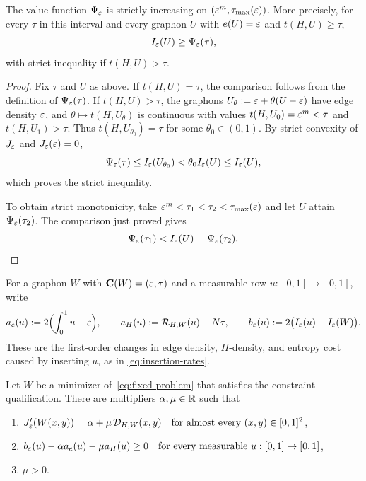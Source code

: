 \begin{lemma}\label{lem:fixed-monotonicity}
The value function $\Psi_\varepsilon$ is strictly increasing on
$(\varepsilon^m,\tau_{\max}(\varepsilon))$.
More precisely, for every $\tau$ in this interval and every graphon $U$
with $e(U)=\varepsilon$ and $t(H,U)\ge\tau$,
\[
  I_\varepsilon(U)\ge\Psi_\varepsilon(\tau),
\]
with strict inequality if $t(H,U)>\tau$.
\end{lemma}

\begin{proof}
Fix $\tau$ and $U$ as above. If $t(H,U)=\tau$, the comparison follows
from the definition of $\Psi_\varepsilon(\tau)$.
If $t(H,U)>\tau$, the graphons $U_\theta:=\varepsilon+\theta(U-\varepsilon)$ have edge
density $\varepsilon$, and $\theta\mapsto t(H,U_\theta)$ is continuous with values
$t(H,U_0)=\varepsilon^m<\tau$ and $t(H,U_1)>\tau$.
Thus $t(H,U_{\theta_0})=\tau$ for some $\theta_0\in(0,1)$.
By strict convexity of $J_\varepsilon$ and $J_\varepsilon(\varepsilon)=0$,
\[
  \Psi_\varepsilon(\tau)\le I_\varepsilon(U_{\theta_0})
  <\theta_0I_\varepsilon(U)\le I_\varepsilon(U),
\]
which proves the strict inequality.

To obtain strict monotonicity, take
$\varepsilon^m<\tau_1<\tau_2<\tau_{\max}(\varepsilon)$ and let $U$ attain
$\Psi_\varepsilon(\tau_2)$. The comparison just proved gives
\[
  \Psi_\varepsilon(\tau_1)<I_\varepsilon(U)=\Psi_\varepsilon(\tau_2).
\]
\end{proof}

For a graphon $W$ with $\mathbf C(W)=(\varepsilon,\tau)$ and a measurable
row $u:[0,1]\to[0,1]$, write
\[
  a_e(u):=2\Bigl(\int_0^1u-\varepsilon\Bigr), \qquad
  a_H(u):=\mathcal R_{H,W}(u)-N\tau, \qquad
  b_\varepsilon(u):=2\bigl(I_\varepsilon(u)-I_\varepsilon(W)\bigr).
\]
These are the first-order changes in edge density, $H$-density, and
entropy cost caused by inserting $u$, as in \eqref{eq:insertion-rates}.

\begin{lemma}\label{lem:fixed-multiplier}
Let $W$ be a minimizer of~\eqref{eq:fixed-problem} that satisfies the
constraint qualification. There are multipliers $\alpha,\mu\in\mathbb R$
such that
\begin{enumerate}[label=(\roman*)]
  \item $J_\varepsilon'(W(x,y))=\alpha+\mu\,\mathcal D_{H,W}(x,y) \quad\text{for almost every }(x,y)\in[0,1]^2$,
  \item $b_\varepsilon(u)-\alpha a_e(u)-\mu a_H(u)\ge0 \quad\text{for every measurable }u:[0,1]\to[0,1]$,
  \item $\mu>0$.
\end{enumerate}
\end{lemma}

